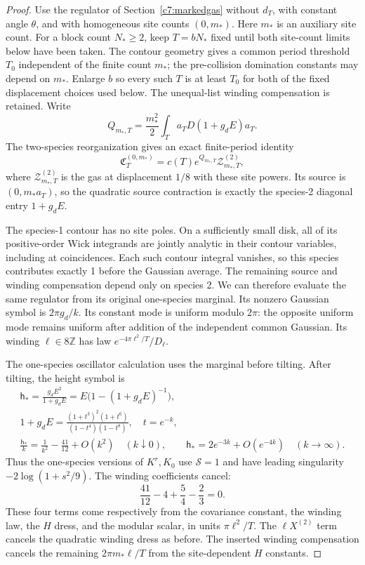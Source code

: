 \begin{proof}
Use the regulator of Section~\ref{c7:markedgas} without $d_T$, with
constant angle $\theta$, and with homogeneous site counts $(0,m_*)$.
Here $m_*$ is an auxiliary site count. For a block count $N_*\ge2$,
keep $T=bN_*$ fixed until both site-count limits below have been taken.
The contour geometry gives a common period threshold $T_0$ independent
of the finite count $m_*$; the pre-collision domination constants may
depend on $m_*$. Enlarge $b$ so every such $T$ is at least $T_0$ for
both of the fixed displacement choices used below.
The unequal-list winding compensation is retained. Write
\[
 Q_{m_*,T}=\frac{m_*^2}{2}\int_T a_TD(1+g_dE)a_T.
\]
The two-species reorganization gives an exact finite-period identity
\begin{equation}\label{c7:two-species-comparison}
 \mathfrak C^{(0,m_*)}_T
 =c(T)e^{Q_{m_*,T}}\mathcal Z^{(2)}_{m_*,T},
\end{equation}
where $\mathcal Z^{(2)}_{m_*,T}$ is the gas at displacement $1/8$ with
these site powers. Its source is $(0,m_*a_T)$, so the quadratic source
contraction is exactly the species-2 diagonal entry $1+g_dE$.

The species-1 contour has no site poles. On a sufficiently small disk,
all of its positive-order Wick integrands are jointly analytic in their
contour variables, including at coincidences. Each such contour
integral vanishes, so this species contributes exactly 1 before the
Gaussian average. The remaining source and winding compensation depend
only on species 2. We can therefore evaluate the same regulator from
its original one-species marginal. Its nonzero Gaussian symbol is
$2\pi g_d/k$. Its constant mode is uniform modulo $2\pi$: the opposite
uniform mode remains uniform after addition of the independent common
Gaussian. Its winding $\ell\in8\mathbb Z$ has law
$e^{-4\pi\ell^2/T}/D_\ell$.

The one-species oscillator calculation uses the marginal before tilting.
After tilting, the height symbol is
\[
\begin{gathered}
 \mathsf h_* =\frac{g_dE^2}{1+g_dE}
 =E\bigl(1-(1+g_dE)^{-1}\bigr),\\
 1+g_dE=\frac{(1+t^3)^2(1+t^6)}{(1-t^4)(1-t^8)},\quad t=e^{-k},\\
 \frac{\mathsf h_*}{k}=\frac1{k^2}-\frac{41}{12}+O(k^2)\quad(k\downarrow0),
 \qquad \mathsf h_*=2e^{-3k}+O(e^{-4k})\quad(k\to\infty).
\end{gathered}
\]
Thus the one-species versions of $K^r,K_0$ use $\mathcal S=1$ and have
leading singularity $-2\log(1+s^2/9)$. The winding coefficients cancel:
\[
 \frac{41}{12}-4+\frac54-\frac23=0.
\]
These four terms come respectively from the covariance constant, the
winding law, the $H$ dress, and the modular scalar, in units
$\pi\ell^2/T$. The $\ell X^{(2)}$ term cancels the quadratic winding
dress as before. The inserted winding compensation cancels the remaining
$2\pi m_*\ell/T$ from the site-dependent $H$ constants.


\end{proof}
